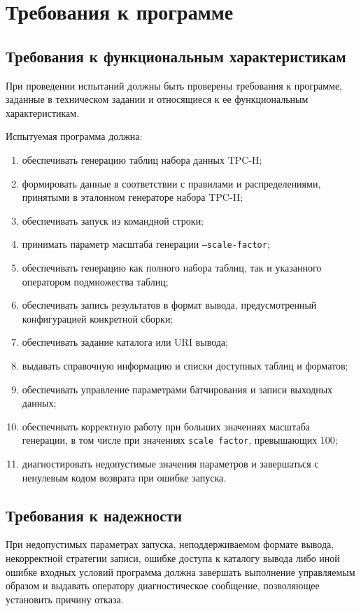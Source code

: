 \section{Требования к программе}

\subsection{Требования к функциональным характеристикам}

При проведении испытаний должны быть проверены требования к программе,
заданные в техническом задании и относящиеся к ее функциональным
характеристикам.

Испытуемая программа должна:
\begin{enumerate}
    \item обеспечивать генерацию таблиц набора данных TPC-H;
    \item формировать данные в соответствии с правилами и распределениями,
    принятыми в эталонном генераторе набора TPC-H;
    \item обеспечивать запуск из командной строки;
    \item принимать параметр масштаба генерации
    \texttt{--scale-factor};
    \item обеспечивать генерацию как полного набора таблиц, так и указанного
    оператором подмножества таблиц;
    \item обеспечивать запись результатов в формат вывода, предусмотренный
    конфигурацией конкретной сборки;
    \item обеспечивать задание каталога или URI вывода;
    \item выдавать справочную информацию и списки доступных
    таблиц и форматов;
    \item обеспечивать управление параметрами батчирования и записи выходных
    данных;
    \item обеспечивать корректную работу при больших значениях масштаба
    генерации, в том числе при значениях \texttt{scale factor}, превышающих
    100;
    \item диагностировать недопустимые значения параметров и
    завершаться с ненулевым кодом возврата при ошибке запуска.
\end{enumerate}

\subsection{Требования к надежности}

При недопустимых параметрах запуска, неподдерживаемом формате вывода,
некорректной стратегии записи, ошибке доступа к каталогу вывода либо иной
ошибке входных условий программа должна завершать выполнение управляемым
образом и выдавать оператору диагностическое сообщение, позволяющее установить
причину отказа.

